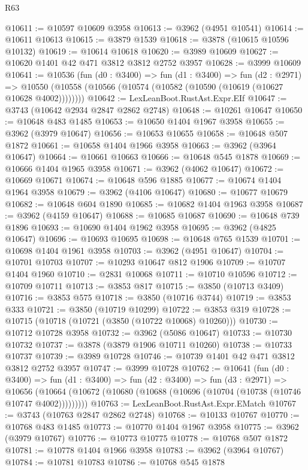 \begin{lexlean}{R63}
\begin{coremodule}
@10611 := @10597 @10609 @3958
@10613 := @3962 (@4951 @10541)
@10614 := @10611 @10613
@10615 := @3879 @1539
@10618 := @3878 (@10615 @10596 @10132)
@10619 := @10614 @10618
@10620 := @3989 @10609
@10627 := @10620 @1401 @42 @471 @3812 @3812 @2752 @3957
@10628 := @3999 @10609
@10641 := @10536
    (fun (d0 : @3400) =>
    fun (d1 : @3400) =>
    fun (d2 : @2971) =>
    @10550 (@10558 (@10566 (@10574 (@10582 (@10590 (@10619 (@10627 @10628 @4002))))))))
@10642 := LexLeanBoot.RustAst.Expr.EIf
@10647 := @3743 (@10642 @2934 @2847 @2862 @2748)
@10648 := @10261 @10647
@10650 := @10648 @483 @1485
@10653 := @10650 @1404 @1967 @3958
@10655 := @3962 (@3979 @10647)
@10656 := @10653 @10655
@10658 := @10648 @507 @1872
@10661 := @10658 @1404 @1966 @3958
@10663 := @3962 (@3964 @10647)
@10664 := @10661 @10663
@10666 := @10648 @545 @1878
@10669 := @10666 @1404 @1965 @3958
@10671 := @3962 (@4062 @10647)
@10672 := @10669 @10671
@10674 := @10648 @596 @1885
@10677 := @10674 @1404 @1964 @3958
@10679 := @3962 (@4106 @10647)
@10680 := @10677 @10679
@10682 := @10648 @604 @1890
@10685 := @10682 @1404 @1963 @3958
@10687 := @3962 (@4159 @10647)
@10688 := @10685 @10687
@10690 := @10648 @739 @1896
@10693 := @10690 @1404 @1962 @3958
@10695 := @3962 (@4825 @10647)
@10696 := @10693 @10695
@10698 := @10648 @765 @1539
@10701 := @10698 @1404 @1961 @3958
@10703 := @3962 (@4951 @10647)
@10704 := @10701 @10703
@10707 := @10293 @10647 @812 @1906
@10709 := @10707 @1404 @1960
@10710 := @2831 @10068
@10711 := @10710 @10596
@10712 := @10709 @10711
@10713 := @3853 @817
@10715 := @3850 (@10713 @3409)
@10716 := @3853 @575
@10718 := @3850 (@10716 @3744)
@10719 := @3853 @333
@10721 := @3850 (@10719 @10299)
@10722 := @3853 @319
@10728 := @10715 (@10718 (@10721 (@3850 (@10722 @10068) @10260)))
@10730 := @10712 @10728 @3958
@10732 := @3962 (@5086 @10647)
@10733 := @10730 @10732
@10737 := @3878 (@3879 @1906 @10711 @10260)
@10738 := @10733 @10737
@10739 := @3989 @10728
@10746 := @10739 @1401 @42 @471 @3812 @3812 @2752 @3957
@10747 := @3999 @10728
@10762 := @10641
    (fun (d0 : @3400) =>
    fun (d1 : @3400) =>
    fun (d2 : @3400) =>
    fun (d3 : @2971) =>
    @10656 (@10664 (@10672 (@10680 (@10688 (@10696 (@10704 (@10738 (@10746 @10747 @4002)))))))))
@10763 := LexLeanBoot.RustAst.Expr.EMatch
@10767 := @3743 (@10763 @2847 @2862 @2748)
@10768 := @10133 @10767
@10770 := @10768 @483 @1485
@10773 := @10770 @1404 @1967 @3958
@10775 := @3962 (@3979 @10767)
@10776 := @10773 @10775
@10778 := @10768 @507 @1872
@10781 := @10778 @1404 @1966 @3958
@10783 := @3962 (@3964 @10767)
@10784 := @10781 @10783
@10786 := @10768 @545 @1878

\end{coremodule}
\end{lexlean}
